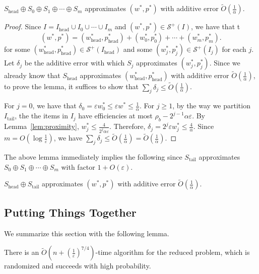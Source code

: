 \documentclass[a4paper,UKenglish,cleveref, autoref, thm-restate, pdfa]{lipics-v2021}
\newcommand{\eps}{\varepsilon}
\renewcommand{\leq}{\leqslant}
\renewcommand{\geq}{\geqslant}
\begin{document}
\begin{lemma}
    $S_{\mathrm{head}} \oplus S_0 \oplus S_1 \oplus \cdots \oplus S_m$ approximates $(w^*, p^*)$ with additive error $\tilde{O}(\frac{1}{\alpha})$.
\end{lemma}
\begin{proof}
    Since $I = I_{\mathrm{head}} \cup I_0 \cup \cdots \cup I_m$ and $(w^*, p^*) \in \mathcal{S}^+(I)$, we have that t
    \[
        (w^*, p^*) = (w^*_{\mathrm{head}}, p^*_{\mathrm{head}}) +  (w^*_0, p^*_0) + \cdots + (w^*_m, p^*_m).
    \]
    for some $(w^*_{\mathrm{head}}, p^*_{\mathrm{head}})  \in \mathcal{S}^+(I_{\mathrm{head}})$ and some $(w^*_j, p^*_j) \in \mathcal{S}^+(I_j)$ for each $j$. Let $\delta_j$ be the additive error with which $S_j$ approximates $(w^*_j, p^*_j)$. Since we already know that $S_{\mathrm{head}}$ approximates  $(w^*_{\mathrm{head}}, p^*_{\mathrm{head}})$ with additive error $\tilde{O}(\frac{1}{\alpha})$, to prove the lemma, it suffices to show that $\sum_j\delta_j \leq \tilde{O}(\frac{1}{\alpha})$.

    For $ j = 0$, we have that 
    \(
        \delta_0 = \eps w^*_0 \leq \eps w^* \leq \frac{1}{\alpha}. 
    \) 
    For $j \geq 1$, by the way we partition $I_{\mathrm{tail}}$,  the the items in $I_j$ have efficiencies at most $\rho_b - 2^{j-1}\alpha\eps$. By Lemma~\ref{lem:proximity}, $w^*_j \leq \frac{4}{2^j\alpha\eps}$. Therefore,
    \(
        \delta_j = 2^j \eps w^*_j \leq \frac{4}{\alpha}.
    \)
    Since $m = O(\log \frac{1}{\eps})$, we have $\sum_j\delta_j \leq \tilde{O}(\frac{1}{\alpha}) = \tilde{O}(\frac{1}{\alpha})$.
\end{proof}

The above lemma immediately implies the following since $S_{\mathrm{tail}}$ approximates $S_0 \oplus S_1 \oplus \cdots \oplus S_m$ with factor $1 + O(\eps)$.
\begin{corollary}
    $S_{\mathrm{head}} \oplus S_{\mathrm{tail}}$ approximates $(w^*, p^*)$ with additive error $\tilde{O}(\frac{1}{\alpha})$.
\end{corollary}

\subsection{Putting Things Together}
We summarize this section with the following lemma.
\begin{lemma}
   There is an $\tilde{O}({n+(\frac{1}{\eps})^{7/4}})$-time algorithm for the reduced problem, which is randomized and succeeds with high probability.
\end{lemma}
\end{document}
